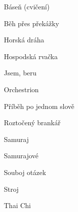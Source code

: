 \large{Báseň (cvičení)}

\large{Běh přes překážky}

\large{Horská dráha}

\large{Hospodská rvačka}

\large{Jsem, beru}

\large{Orchestrion}

\large{Příběh po jednom slově}

\large{Roztočený brankář}

\large{Samuraj}

\large{Samurajové}

\large{Souboj otázek}

\large{Stroj}

\large{Thai Chi}